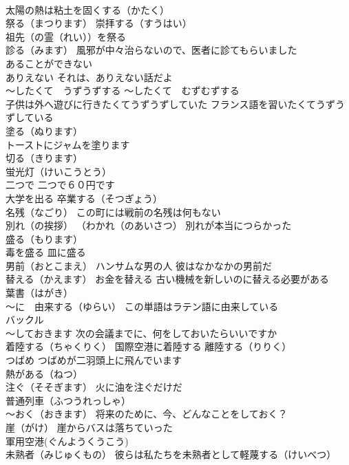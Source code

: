 \documentclass[8pt]{extreport}
\begin{document}
\begin{CJK}{UTF8}{min}
\\	太陽の熱は粘土を固くする（かたく）
\\	祭る（まつります） 崇拝する（すうはい） 
\\	祖先（の霊（れい））を祭る
\\	診る（みます） 風邪が中々治らないので、医者に診てもらいました
\\	あることができない 
\\	ありえない それは、ありえない話だよ
\\	～したくて　うずうずする ～したくて　むずむずする 
\\	子供は外へ遊びに行きたくてうずうずしていた フランス語を習いたくてうずうずしている
\\	塗る（ぬります）
\\	トーストにジャムを塗ります
\\	切る（きります）
\\	蛍光灯（けいこうとう）
\\	二つで 二つで６０円です
\\	大学を出る 卒業する（そつぎょう）
\\	名残（なごり） この町には戦前の名残は何もない
\\	別れ（の挨拶） （わかれ（のあいさつ） 別れが本当につらかった
\\	盛る（もります） 
\\	毒を盛る 皿に盛る
\\	男前（おとこまえ） ハンサムな男の人 彼はなかなかの男前だ
\\	替える（かえます） お金を替える 古い機械を新しいのに替える必要がある
\\	葉書（はがき）
\\	～に　由来する（ゆらい） この単語はラテン語に由来している
\\	バックル
\\	～しておきます 次の会議までに、何をしておいたらいいですか
\\	着陸する（ちゃくりく） 国際空港に着陸する 離陸する（りりく）
\\	つばめ つばめが二羽頭上に飛んでいます
\\	熱がある（ねつ）
\\	注ぐ（そそぎます） 火に油を注ぐだけだ
\\	普通列車（ふつうれっしゃ）
\\	～おく（おきます） 将来のために、今、どんなことをしておく？
\\	崖（がけ） 崖からバスは落ちていった
\\	軍用空港(ぐんようくうこう)
\\	未熟者（みじゅくもの） 彼らは私たちを未熟者として軽蔑する（けいべつ）

\end{CJK}
\end{document}
